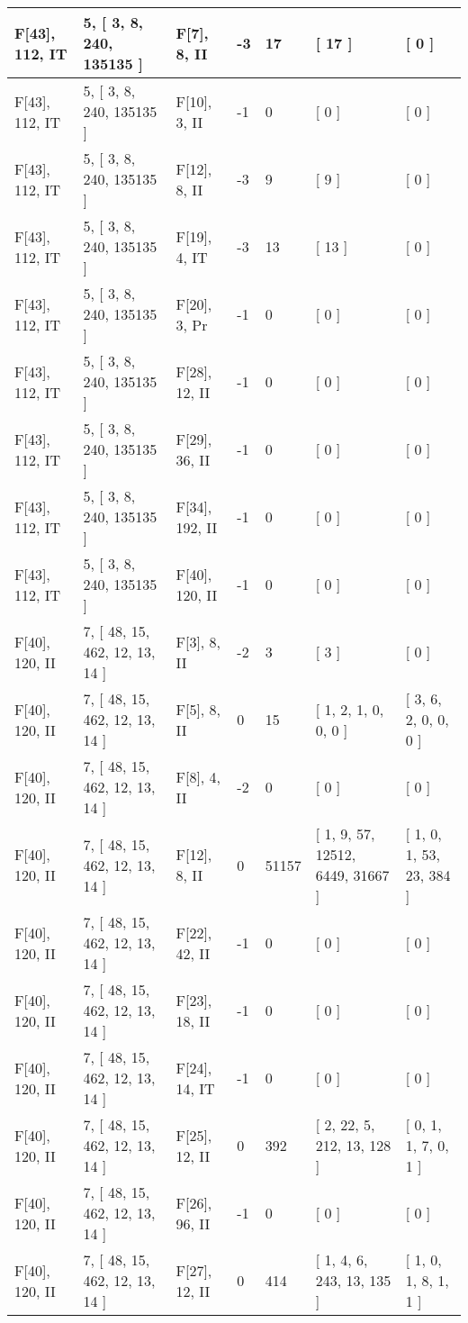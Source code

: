 \documentclass[9 pt]{scrartcl}
\begin{document}
\begin{longtable}{ |p{3em}|p{6em}|p{3em}|p{2em}|p{2em}|p{6em}|p{6em}| }
F[43], 112, IT &5, [ 3, 8, 240, 135135 ] & F[7], 8, II  & -3 & 17 & [ 17 ] & [ 0 ]\\ \hline
F[43], 112, IT &5, [ 3, 8, 240, 135135 ] & F[10], 3, II  & -1 & 0 & [ 0 ] & [ 0 ]\\ \hline
F[43], 112, IT &5, [ 3, 8, 240, 135135 ] & F[12], 8, II  & -3 & 9 & [ 9 ] & [ 0 ]\\ \hline
F[43], 112, IT &5, [ 3, 8, 240, 135135 ] & F[19], 4, IT  & -3 & 13 & [ 13 ] & [ 0 ]\\ \hline
F[43], 112, IT &5, [ 3, 8, 240, 135135 ] & F[20], 3, Pr  & -1 & 0 & [ 0 ] & [ 0 ]\\ \hline
F[43], 112, IT &5, [ 3, 8, 240, 135135 ] & F[28], 12, II  & -1 & 0 & [ 0 ] & [ 0 ]\\ \hline
F[43], 112, IT &5, [ 3, 8, 240, 135135 ] & F[29], 36, II  & -1 & 0 & [ 0 ] & [ 0 ]\\ \hline
F[43], 112, IT &5, [ 3, 8, 240, 135135 ] & F[34], 192, II  & -1 & 0 & [ 0 ] & [ 0 ]\\ \hline
F[43], 112, IT &5, [ 3, 8, 240, 135135 ] & F[40], 120, II  & -1 & 0 & [ 0 ] & [ 0 ]\\ \hline
F[40], 120, II &7, [ 48, 15, 462, 12, 13, 14 ] & F[3], 8, II  & -2 & 3 & [ 3 ] & [ 0 ]\\ \hline
F[40], 120, II &7, [ 48, 15, 462, 12, 13, 14 ] & F[5], 8, II  & 0 & 15 & [ 1, 2, 1, 0, 0, 0 ] & [ 3, 6, 2, 0, 0, 0 ]\\ \hline
F[40], 120, II &7, [ 48, 15, 462, 12, 13, 14 ] & F[8], 4, II  & -2 & 0 & [ 0 ] & [ 0 ]\\ \hline
F[40], 120, II &7, [ 48, 15, 462, 12, 13, 14 ] & F[12], 8, II  & 0 & 51157 & [ 1, 9, 57, 12512, 6449, 31667 ] & [ 1, 0, 1, 53, 23, 384 ]\\ \hline
F[40], 120, II &7, [ 48, 15, 462, 12, 13, 14 ] & F[22], 42, II  & -1 & 0 & [ 0 ] & [ 0 ]\\ \hline
F[40], 120, II &7, [ 48, 15, 462, 12, 13, 14 ] & F[23], 18, II  & -1 & 0 & [ 0 ] & [ 0 ]\\ \hline
F[40], 120, II &7, [ 48, 15, 462, 12, 13, 14 ] & F[24], 14, IT  & -1 & 0 & [ 0 ] & [ 0 ]\\ \hline
F[40], 120, II &7, [ 48, 15, 462, 12, 13, 14 ] & F[25], 12, II  & 0 & 392 & [ 2, 22, 5, 212, 13, 128 ] & [ 0, 1, 1, 7, 0, 1 ]\\ \hline
F[40], 120, II &7, [ 48, 15, 462, 12, 13, 14 ] & F[26], 96, II  & -1 & 0 & [ 0 ] & [ 0 ]\\ \hline
F[40], 120, II &7, [ 48, 15, 462, 12, 13, 14 ] & F[27], 12, II  & 0 & 414 & [ 1, 4, 6, 243, 13, 135 ] & [ 1, 0, 1, 8, 1, 1 ]\\ \hline

\end{longtable}
\end{document}
